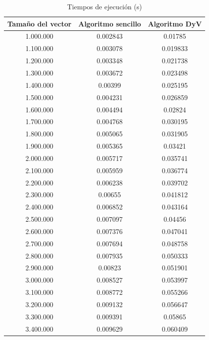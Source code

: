\documentclass[12pt,spanish]{article}
\begin{document}
\begin{table}[H]
\centering
\begin{tabular}{|c|c|c|}
\hline
\textbf{Tamaño del vector} &\textbf{Algoritmo sencillo} & \textbf{Algoritmo DyV}\\
\hline
1.000.000 & 0.002843 & 0.01785 \\
\hline
1.100.000 & 0.003078 & 0.019833 \\
\hline
1.200.000 & 0.003348 & 0.021738 \\
\hline
1.300.000 & 0.003672 & 0.023498 \\
\hline
1.400.000 & 0.00399 & 0.025195 \\
\hline
1.500.000 & 0.004231 & 0.026859 \\
\hline
1.600.000 & 0.004494 & 0.02824 \\
\hline
1.700.000 & 0.004768 & 0.030195 \\
\hline
1.800.000 & 0.005065 & 0.031905 \\
\hline
1.900.000 & 0.005365 & 0.03421 \\
\hline
2.000.000 & 0.005717 & 0.035741 \\
\hline
2.100.000 & 0.005959 & 0.036774 \\
\hline
2.200.000 & 0.006238 & 0.039702 \\
\hline
2.300.000 & 0.00655 & 0.041812 \\
\hline
2.400.000 & 0.006852 & 0.043164 \\
\hline
2.500.000 & 0.007097 & 0.04456 \\
\hline
2.600.000 & 0.007376 & 0.047041 \\
\hline
2.700.000 & 0.007694 & 0.048758 \\
\hline
2.800.000 & 0.007935 & 0.050333 \\
\hline
2.900.000 & 0.00823 & 0.051901 \\
\hline
3.000.000 & 0.008527 & 0.053997 \\
\hline
3.100.000 & 0.008772 & 0.055266 \\
\hline
3.200.000 & 0.009132 & 0.056647 \\
\hline
3.300.000 & 0.009391 & 0.05865 \\
\hline
3.400.000 & 0.009629 & 0.060409 \\
\hline
\end{tabular}
\caption{Tiempos de ejecución (s)}
\end{table}
\end{document}
